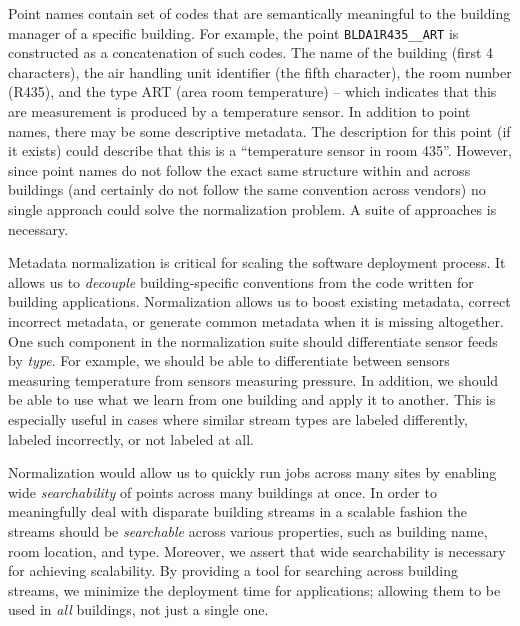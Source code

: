 Point names contain set of codes that are 
semantically meaningful to the building manager of a specific building.
For example, the point \texttt{BLDA1R435\_\_ART} is constructed as a concatenation of such codes.
The name of the building (first 4 characters), the air handling unit identifier (the 
fifth character), the room number (R435), and the type ART (area room temperature) -- which 
indicates that this are measurement is produced by a temperature sensor. In addition
to point names, there may be some descriptive metadata.  The description for this point (if it 
exists) could describe that this is a ``temperature sensor in room 435''.
However, since point names do not follow the exact same structure within and across
buildings (and certainly do not follow the same convention across vendors)
no single approach could solve the normalization problem.  A suite of approaches is necessary.



Metadata normalization is critical for scaling the software deployment process.  
It allows us to
\emph{decouple} building-specific conventions from the code written for building applications.  Normalization allows us to
boost existing metadata, correct incorrect metadata, or generate common metadata when it is missing altogether.
One such component in the normalization suite should differentiate sensor feeds by \emph{type}.  For example, we should be able to 
differentiate between sensors measuring 
temperature from sensors measuring pressure.  In addition, we should be able to use what we learn from one building and apply
it to another.  This is especially useful in cases where similar stream types are labeled differently, labeled incorrectly,
 or not labeled at all.

Normalization would allow us to quickly run jobs across many sites by enabling wide \emph{searchability} of points across many buildings at once.
In order to meaningfully deal with disparate building streams in a scalable 
fashion the streams should be \emph{searchable} across various properties, such
as building name, room location, and type.  Moreover, we
assert that wide searchability is necessary for achieving scalability.  By providing a tool for
searching across building streams, we minimize the deployment time for applications;  
allowing them to be used in \emph{all} buildings, not just a single one.


